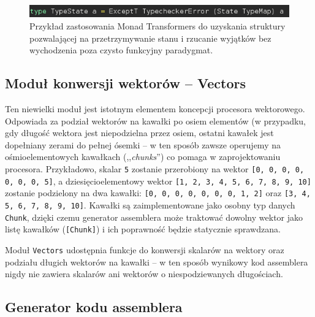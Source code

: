 \begin{figure}
  \begin{center}
    \includegraphics[scale=0.5]{images/type-state.png}
    \caption{Przykład zastosowania Monad Transformers do uzyskania struktury pozwalającej na przetrzymywanie stanu i rzucanie wyjątków bez wychodzenia poza czysto funkcyjny paradygmat.}
    \label{fig:type-state}
  \end{center}
\end{figure}

\subsection{Moduł konwersji wektorów -- Vectors}

Ten niewielki moduł jest istotnym elementem koncepcji procesora wektorowego. Odpowiada za podział wektorów na kawałki po osiem elementów (w przypadku, gdy długość wektora jest niepodzielna przez osiem, ostatni kawałek jest dopełniany zerami do pełnej ósemki -- w ten sposób zawsze operujemy na ośmioelementowych kawałkach (,,\textit{chunks}'') co pomaga w zaprojektowaniu procesora. Przykładowo, skalar \texttt{5} zostanie przerobiony na wektor \texttt{[0, 0, 0, 0, 0, 0, 0, 5]}, a dziesięcioelementowy wektor \texttt{[1, 2, 3, 4, 5, 6, 7, 8, 9, 10]} zostanie podzielony na dwa kawałki: \texttt{[0, 0, 0, 0, 0, 0, 0, 1, 2]} oraz \texttt{[3, 4, 5, 6, 7, 8, 9, 10]}. Kawałki są zaimplementowane jako osobny typ danych \texttt{Chunk}, dzięki czemu generator assemblera może traktować dowolny wektor jako listę kawałków (\texttt{[Chunk]}) i ich poprawność będzie statycznie sprawdzana.

Moduł \texttt{Vectors} udostępnia funkcje do konwersji skalarów na wektory oraz podziału długich wektorów na kawałki -- w ten sposób wynikowy kod assemblera nigdy nie zawiera skalarów ani wektorów o niespodziewanych długościach.


\subsection{Generator kodu assemblera}


